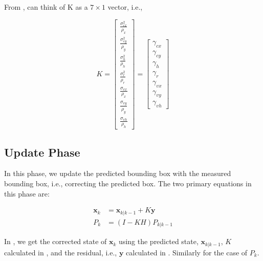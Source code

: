 \documentclass[10pt]{article}
\begin{document}
    \noindent From , can think of K as a \(7 \times 1\) vector, i.e., 

    \begin{equation}
        K = \begin{bmatrix}
            \frac{\sigma^2_{cx}}{\rho_x} \\[5pt]
            \frac{\sigma^2_{cy}}{\rho_y} \\[5pt]
            \frac{\sigma^2_h}{\rho_h} \\[5pt]
            \frac{\sigma^2_r}{\rho_r} \\[5pt]
            \frac{\sigma_{vx}}{\rho_x} \\[5pt]
            \frac{\sigma_{vy}}{\rho_y} \\[5pt]
            \frac{\sigma_{vh}}{\rho_h}
        \end{bmatrix}
        = \begin{bmatrix}
            \gamma_{cx} \\
            \gamma_{cy} \\
            \gamma_h \\
            \gamma_r \\
            \gamma_{vx} \\
            \gamma_{vy} \\
            \gamma_{vh}
        \end{bmatrix}
        \label{Eq:K_definition}
    \end{equation}

    \subsection{Update Phase}

    In this phase, we update the predicted bounding box with the measured bounding box, i.e., correcting the predicted box. The two primary equations in this phase are:
    
    \begin{align}
        \mathbf{x}_k &= \mathbf{x}_{k|k-1} + K\mathbf{y} \label{Eq:Update-Eq-1} \\
        P_k &= (I - KH)P_{k|k-1} \label{Eq:Update-Eq-2}
    \end{align}

    \noindent In , we get the corrected state of \(\mathbf{x}_k\) using the predicted state, \(\mathbf{x}_{k|k-1}\), \(K\) calculated in 
    , and the residual, i.e., \(\mathbf{y}\) calculated in . Similarly for the case of \(P_k\). 
\end{document}
